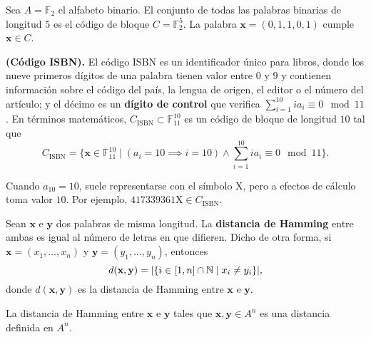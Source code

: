 \begin{example}
	Sea $A = \mathbb{F}_2$ el alfabeto binario. El conjunto de todas las palabras binarias de longitud $5$ es el código de bloque $C = \mathbb{F}_2^5$. La palabra $\textbf{x} = (0, 1, 1, 0, 1)$ cumple $\textbf{x} \in C$.
\end{example}

\begin{example} \textbf{(Código ISBN).}
	El código ISBN es un identificador único para libros, donde los nueve primeros dígitos de una palabra tienen valor entre $0$ y $9$ y contienen información sobre el código del país, la lengua de origen, el editor o el número del artículo; y el décimo es un \textbf{dígito de control} que verifica $\sum_{i=1}^{10} ia_i \equiv 0 \mod 11$. En términos matemáticos, $C_{\textrm{ISBN}}\subset\mathbb{F}_{11}^{10}$ es un código de bloque de longitud $10$ tal que
	\[C_{\textrm{ISBN}} = \{\textbf{x}\in\mathbb{F}_{11}^{10} \mid (a_i = 10 \implies i = 10) \wedge \sum_{i=1}^{10}ia_i \equiv 0 \mod 11\}.\]
	\begin{remark}
		Cuando $a_{10} = 10$, suele representarse con el símbolo $\textrm{X}$, pero a efectos de cálculo toma valor $10$. Por ejemplo, $\textrm{417339361X} \in C_{\textrm{ISBN}}$.
	\end{remark}
\end{example}

\begin{definition}
	Sean $\textbf{x}$ e $\textbf{y}$ dos palabras de misma longitud. La \textbf{distancia de Hamming} entre ambas es igual al número de letras en que difieren. Dicho de otra forma, si $\textbf{x} = (x_1, \hdots, x_n)$ y $\textbf{y} = (y_1, \hdots, y_n)$, entonces
	\[d(\textbf{x}, \textbf{y}) = |\{i\in[1, n]\cap\mathbb{N} \mid x_i \neq y_i\}|,\]
	donde $d(\textbf{x}, \textbf{y})$ es la distancia de Hamming entre $\textbf{x}$ e $\textbf{y}$.
\end{definition}

\begin{theorem}
	La distancia de Hamming entre  $\textbf{x}$ e $\textbf{y}$ tales que $\textbf{x}, \textbf{y} \in A^n$ es una distancia definida en $A^n$.
\end{theorem}

